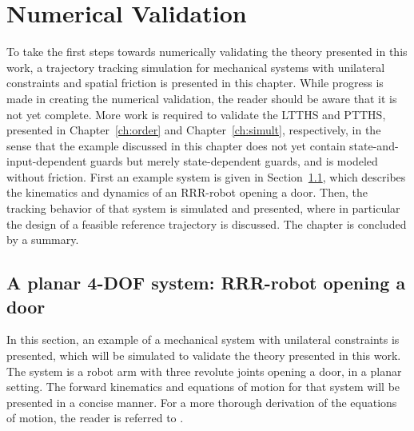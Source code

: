 \documentclass[../DC2019003Bouma.tex]{subfiles}
\begin{document}
\graphicspath{{04_Validation/img/}}
\renewcommand{\chaptermark}[1]{\markboth{\thechapter.\ #1}{}}
\renewcommand{\sectionmark}[1]{\markright{#1}{}}
\pagestyle{fancyreport}
\cleartooddpage
\pagestyle{fancyreport}
\chapter{Numerical Validation}\label{ch:vali}
To take the first steps towards numerically validating the theory presented in this work, a trajectory tracking simulation for mechanical systems with unilateral constraints and spatial friction is presented in this chapter. While progress is made in creating the numerical validation, the reader should be aware that it is not yet complete. More work is required to validate the LTTHS and PTTHS, presented in Chapter~\ref{ch:order} and Chapter~\ref{ch:simult}, respectively, in the sense that the example discussed in this chapter does not yet contain state-and-input-dependent guards but merely state-dependent guards, and is modeled without friction. First an example system is given in Section~\ref{sec:5sys}, which describes the kinematics and dynamics of an RRR-robot opening a door. Then, the tracking behavior of that system is simulated and presented, where in particular the design of a feasible reference trajectory is discussed. The chapter is concluded by a summary.

\section{A planar 4-DOF system: RRR-robot opening a door}\label{sec:5sys}
In this section, an example of a mechanical system with unilateral constraints is presented, which will be simulated to validate the theory presented in this work. The system is a robot arm with three revolute joints opening a door, in a planar setting. The forward kinematics and equations of motion for that system will be presented in a concise manner. For a more thorough derivation of the equations of motion, the reader is referred to \cite{Rijnen2018b}. 
\end{document}
